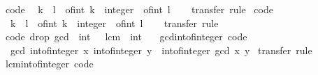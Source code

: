 \begin{isabellebody}
\endisatagproof
{\isafoldproof}%
%
\isadelimproof
\isanewline
%
\endisadelimproof
\isanewline
{}\isamarkupfalse%
\ {\isacharbrackleft}code{\isacharbrackright}{\isacharcolon}\isanewline
\ \ {\isachardoublequoteopen}k\ {\isasymle}\ l\ {\isasymlongleftrightarrow}\ {\isacharparenleft}of{\isacharunderscore}int\ k\ {\isacharcolon}{\isacharcolon}\ integer{\isacharparenright}\ {\isasymle}\ of{\isacharunderscore}int\ l{\isachardoublequoteclose}\isanewline
%
\isadelimproof
\ \ %
\endisadelimproof
%
\isatagproof
{}\isamarkupfalse%
\ transfer\ rule%
\endisatagproof
{\isafoldproof}%
%
\isadelimproof
\isanewline
%
\endisadelimproof
\isanewline
{}\isamarkupfalse%
\ {\isacharbrackleft}code{\isacharbrackright}{\isacharcolon}\isanewline
\ \ {\isachardoublequoteopen}k\ {\isacharless}\ l\ {\isasymlongleftrightarrow}\ {\isacharparenleft}of{\isacharunderscore}int\ k\ {\isacharcolon}{\isacharcolon}\ integer{\isacharparenright}\ {\isacharless}\ of{\isacharunderscore}int\ l{\isachardoublequoteclose}\isanewline
%
\isadelimproof
\ \ %
\endisadelimproof
%
\isatagproof
{}\isamarkupfalse%
\ transfer\ rule%
\endisatagproof
{\isafoldproof}%
%
\isadelimproof
\isanewline
%
\endisadelimproof
\isanewline
{}\isamarkupfalse%
\ {\isacharbrackleft}{\isacharbrackleft}code\ drop{\isacharcolon}\ {\isachardoublequoteopen}gcd\ {\isacharcolon}{\isacharcolon}\ int\ {\isasymRightarrow}\ {\isacharunderscore}{\isachardoublequoteclose}\ {\isachardoublequoteopen}lcm\ {\isacharcolon}{\isacharcolon}\ int\ {\isasymRightarrow}\ {\isacharunderscore}{\isachardoublequoteclose}{\isacharbrackright}{\isacharbrackright}\isanewline
\isanewline
{}\isamarkupfalse%
\ gcd{\isacharunderscore}int{\isacharunderscore}of{\isacharunderscore}integer\ {\isacharbrackleft}code{\isacharbrackright}{\isacharcolon}\isanewline
\ \ {\isachardoublequoteopen}gcd\ {\isacharparenleft}int{\isacharunderscore}of{\isacharunderscore}integer\ x{\isacharparenright}\ {\isacharparenleft}int{\isacharunderscore}of{\isacharunderscore}integer\ y{\isacharparenright}\ {\isacharequal}\ int{\isacharunderscore}of{\isacharunderscore}integer\ {\isacharparenleft}gcd\ x\ y{\isacharparenright}{\isachardoublequoteclose}\isanewline
%
\isadelimproof
%
\endisadelimproof
%
\isatagproof
{}\isamarkupfalse%
\ transfer\ rule%
\endisatagproof
{\isafoldproof}%
%
\isadelimproof
\isanewline
%
\endisadelimproof
\isanewline
{}\isamarkupfalse%
\ lcm{\isacharunderscore}int{\isacharunderscore}of{\isacharunderscore}integer\ {\isacharbrackleft}code{\isacharbrackright}{\isacharcolon}\isanewline

\end{isabellebody}
